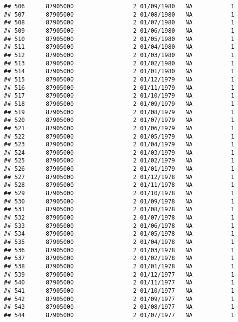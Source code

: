 \documentclass[
]{article}
\begin{document}
\begin{verbatim}
## 506      87905000                 2 01/09/1980   NA           1
## 507      87905000                 2 01/08/1980   NA           1
## 508      87905000                 2 01/07/1980   NA           1
## 509      87905000                 2 01/06/1980   NA           1
## 510      87905000                 2 01/05/1980   NA           1
## 511      87905000                 2 01/04/1980   NA           1
## 512      87905000                 2 01/03/1980   NA           1
## 513      87905000                 2 01/02/1980   NA           1
## 514      87905000                 2 01/01/1980   NA           1
## 515      87905000                 2 01/12/1979   NA           1
## 516      87905000                 2 01/11/1979   NA           1
## 517      87905000                 2 01/10/1979   NA           1
## 518      87905000                 2 01/09/1979   NA           1
## 519      87905000                 2 01/08/1979   NA           1
## 520      87905000                 2 01/07/1979   NA           1
## 521      87905000                 2 01/06/1979   NA           1
## 522      87905000                 2 01/05/1979   NA           1
## 523      87905000                 2 01/04/1979   NA           1
## 524      87905000                 2 01/03/1979   NA           1
## 525      87905000                 2 01/02/1979   NA           1
## 526      87905000                 2 01/01/1979   NA           1
## 527      87905000                 2 01/12/1978   NA           1
## 528      87905000                 2 01/11/1978   NA           1
## 529      87905000                 2 01/10/1978   NA           1
## 530      87905000                 2 01/09/1978   NA           1
## 531      87905000                 2 01/08/1978   NA           1
## 532      87905000                 2 01/07/1978   NA           1
## 533      87905000                 2 01/06/1978   NA           1
## 534      87905000                 2 01/05/1978   NA           1
## 535      87905000                 2 01/04/1978   NA           1
## 536      87905000                 2 01/03/1978   NA           1
## 537      87905000                 2 01/02/1978   NA           1
## 538      87905000                 2 01/01/1978   NA           1
## 539      87905000                 2 01/12/1977   NA           1
## 540      87905000                 2 01/11/1977   NA           1
## 541      87905000                 2 01/10/1977   NA           1
## 542      87905000                 2 01/09/1977   NA           1
## 543      87905000                 2 01/08/1977   NA           1
## 544      87905000                 2 01/07/1977   NA           1

\end{verbatim}
\end{document}
